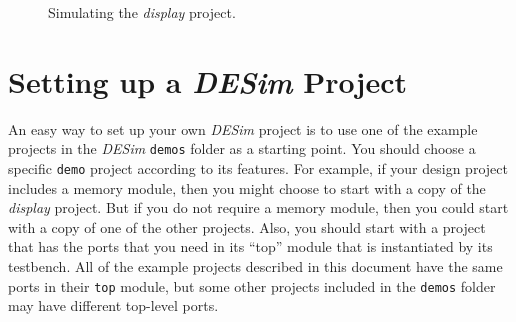 \documentclass[epsfig,10pt,fullpage]{article} \addtolength{\textwidth}{1.5in}
\begin{document}
\begin{figure}[t]
	\begin{center}
        \setlength{\fboxsep}{0pt}
	\end{center}
          \caption{Simulating the {\it display} project.}
	\label{fig:sim3}
\end{figure}

\section*{Setting up a {\it DESim} Project}

An easy way to set up your own {\it DESim} project is to use one of the example projects in
the {\it DESim} \texttt{demos} folder as a starting point. You should choose a specific 
\texttt{demo} project according to its features. 
For example, if your design project includes a memory module, then you might choose to start 
with a copy of the {\it display} project. But if you do not require a memory module, then 
you could start with a copy of one of the other projects. Also, you should start
with a project that has the ports that you need in its ``top'' module that is instantiated by
its testbench. All of the example projects described in this document have the same ports
in their \texttt{top} module, but some other projects included in the \texttt{demos} folder 
may have different top-level ports. 
\end{document}
